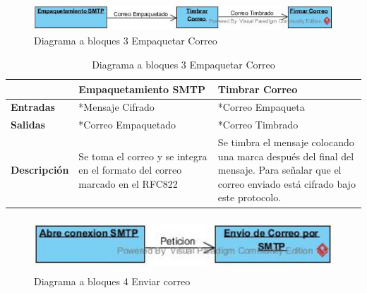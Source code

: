 \documentclass[12pt,oneside,onecolumn,openany]{report}
\begin{document}
\begin{figure}[H]
	\includegraphics[width=1\linewidth, height=1cm]{./images/bloques3.jpg}
	\caption{Diagrama a bloques 3 Empaquetar Correo}
	\label{fig:5-3-1}
\end{figure}

\begin{table}[H]
 \centering
   {
     \begin{tabular}{| p{4cm} | p{4cm} | p{4cm} |}
     \hline
     & \textbf{Empaquetamiento SMTP} & \textbf{Timbrar Correo}\\
     \hline
     \textbf{Entradas} & *Mensaje Cifrado & *Correo Empaqueta\\
     \hline
     \textbf{Salidas} & *Correo Empaquetado & *Correo Timbrado\\
     \hline
     \textbf{Descripción} & Se toma el correo y se integra en el formato del correo marcado en el RFC822 & Se timbra el mensaje colocando una marca después del final del mensaje. Para señalar que el correo enviado está cifrado bajo este protocolo.\\

    \end{tabular}
    }
    \caption{Diagrama a bloques 3 Empaquetar Correo}
    \label{tabla:b3}
\end{table}

\begin{figure}[H]
	\includegraphics[width=1\linewidth, height=2cm]{./images/bloques4.jpg}
	\caption{Diagrama a bloques 4 Enviar correo}
	\label{fig:5-4-1}
\end{figure}
\end{document}
